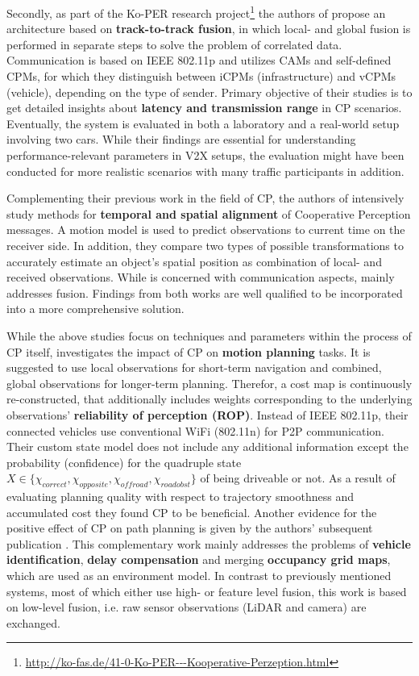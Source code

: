Secondly, as part of the Ko-PER research project\footnote{\url{http://ko-fas.de/41-0-Ko-PER---Kooperative-Perzeption.html}} the authors of \cite{Rauch2011} propose an architecture based on \textbf{track-to-track fusion}, in which local- and global fusion is performed in separate steps to solve the problem of correlated data. Communication is based on IEEE 802.11p and utilizes CAMs and self-defined CPMs, for which they distinguish between iCPMs (infrastructure) and vCPMs (vehicle), depending on the type of sender. Primary objective of their studies is to get detailed insights about \textbf{latency and transmission range} in CP scenarios. Eventually, the system is evaluated in both a laboratory and a real-world setup involving two cars. While their findings are essential for understanding performance-relevant parameters in V2X setups, the evaluation might have been conducted for more realistic scenarios with many traffic participants in addition.
\par
\bigskip

Complementing their previous work in the field of CP, the authors of \cite{Rauch2012} intensively study methods for \textbf{temporal and spatial alignment} of Cooperative Perception messages. A motion model is used to predict observations to current time on the receiver side. In addition, they compare two types of possible transformations to accurately estimate an object's spatial position as combination of local- and received observations. While \cite{Rauch2011} is concerned with communication aspects, \cite{Rauch2012} mainly addresses fusion. Findings from both works are well qualified to be incorporated into a more comprehensive solution. 
\par
\bigskip

While the above studies focus on techniques and parameters within the process of CP itself, \cite{liu2013motion} investigates the impact of CP on \textbf{motion planning} tasks. It is suggested to use local observations for short-term navigation and combined, global observations for longer-term planning. Therefor, a cost map is continuously re-constructed, that additionally includes weights corresponding to the underlying observations' \textbf{reliability of perception (ROP)}. Instead of IEEE 802.11p, their connected vehicles use conventional WiFi (802.11n) for P2P communication. Their custom state model does not include any additional information except the probability (confidence) for the quadruple state $X \in \{\chi_{correct}, \chi_{opposite}, \chi_{offroad}, \chi_{roadobst}\}$ of being driveable or not. As a result of evaluating planning quality with respect to trajectory smoothness and accumulated cost they found CP to be beneficial. Another evidence for the positive effect of CP on path planning is given by the authors' subsequent publication \cite{kim2013cooperative}. This complementary work mainly addresses the problems of \textbf{vehicle identification}, \textbf{delay compensation} and merging \textbf{occupancy grid maps}, which are used as an environment model. In contrast to previously mentioned systems, most of which either use high- or feature level fusion, this work is based on low-level fusion, i.e. raw sensor observations (LiDAR and camera) are exchanged. 
\par
\bigskip

